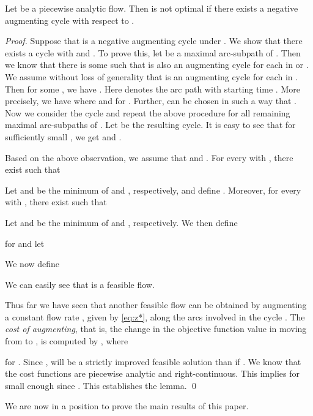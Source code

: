 \documentclass{svjour3}                     \smartqed
\begin{document}
\begin{lemma}
\label{lem:NGOC}
Let  be a piecewise analytic flow. Then  is not optimal if there exists a negative augmenting cycle with respect to .
\end{lemma}
\begin{proof}
Suppose that  is a negative augmenting cycle under .
We show that there exists a cycle  with  and \mbox{}.
To prove this, let  be a maximal arc-subpath of . Then we know that there is some  such that  is also an augmenting cycle for each  in  or . We assume without loss of generality that  is an augmenting cycle for each  in . Then for some , we have . Here  denotes the arc path  with starting time . More precisely, we have  where  and  for . Further,  can be chosen in such a way that . Now we consider the cycle  and repeat the above procedure for all remaining maximal arc-subpaths of . Let  be the resulting cycle. It is easy to see that for sufficiently small , we get  and .

Based on the above observation, we assume that  and \mbox{}. For every
 with , there exist 
such that


Let
  and  be the minimum of  and ,
 respectively, and define .
 Moreover, for every
 with , there exist 
such that

Let
 and  be the minimum of  and ,
respectively. We then define

for  and let

We now define

We can easily see that  is a feasible flow.


Thus far we have seen that another feasible flow  can be obtained by augmenting a constant flow rate , given by \eqref{eq:z*}, along the arcs involved in the cycle
. The \emph{cost of augmenting}, that is, the change in
the objective function value in moving from  to , is computed by
 , where

for . Since ,  will be a strictly improved feasible solution than
 if . We know that the cost functions  are
piecewise analytic and right-continuous. This implies
 for  small enough since .
This establishes the lemma.
\qed
\end{proof}

We are now in a position to prove the main results of this paper.
\end{document}
